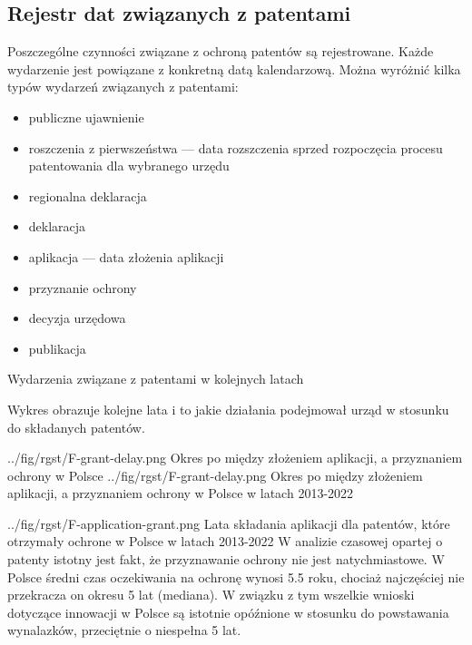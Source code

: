   \newpage\subsection
{Rejestr dat związanych z patentami}

Poszczególne czynności związane z ochroną patentów są rejestrowane.
Każde wydarzenie jest powiązane z konkretną datą kalendarzową.
Można wyróżnić kilka typów wydarzeń związanych z patentami:

  \begin{itemize}

\item
publiczne ujawnienie 


\item
roszczenia z pierwszeństwa  --- 
data rozszczenia sprzed rozpoczęcia procesu patentowania dla wybranego urzędu


\item
regionalna deklaracja 


\item
deklaracja 


\item
aplikacja  --- data złożenia aplikacji


\item
przyznanie ochrony 


\item
decyzja urzędowa


\item
publikacja
\end{itemize}



  \newpage
{}
{Wydarzenia związane z patentami w kolejnych latach}

Wykres obrazuje kolejne lata i to jakie
działania podejmował urząd w stosunku do składanych patentów.



  \newpage
\figsides
{../fig/rgst/F-grant-delay.png}
{Okres po między złożeniem aplikacji, a przyznaniem ochrony w Polsce}
{../fig/rgst/F-grant-delay.png}
{ Okres po między złożeniem aplikacji, a przyznaniem ochrony w Polsce 
  w latach 2013-2022 }

\figside
{../fig/rgst/F-application-grant.png}
{ Lata składania aplikacji dla patentów, które otrzymały ochrone w Polsce
  w latach 2013-2022 }
{ W analizie czasowej opartej o patenty istotny jest fakt, że przyznawanie ochrony
  nie jest natychmiastowe. W Polsce średni czas oczekiwania na ochronę wynosi
  5.5 roku, chociaż najczęściej nie przekracza on okresu 5 lat (mediana).
  W związku z tym wszelkie wnioski dotyczące innowacji w Polsce są istotnie
  opóźnione w stosunku do powstawania wynalazków, przeciętnie o niespełna 5 lat. }


